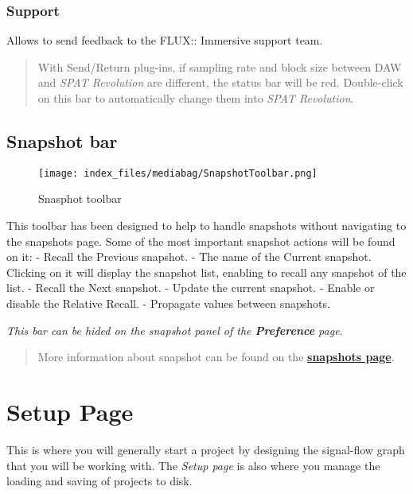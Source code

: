\documentclass[
  letterpaper,
  DIV=11,
  numbers=noendperiod]{scrreport}
\begin{document}
\hypertarget{support}{%
\subsection{Support}\label{support}}

Allows to send feedback to the FLUX:: Immersive support team.

\begin{quote}
With Send/Return plug-ins, if sampling rate and block size between DAW
and \emph{SPAT Revolution} are different, the status bar will be red.
Double-click on this bar to automatically change them into \emph{SPAT
Revolution}.
\end{quote}

\hypertarget{snapshot-bar}{%
\section{Snapshot bar}\label{snapshot-bar}}

\begin{figure}

{\centering \texttt{[image: index\_files/mediabag/SnapshotToolbar.png]}

}

\caption{Snasphot toolbar}

\end{figure}

This toolbar has been designed to help to handle snapshots without
navigating to the snapshots page. Some of the most important snapshot
actions will be found on it: - Recall the Previous snapshot. - The name
of the Current snapshot. Clicking on it will display the snapshot list,
enabling to recall any snapshot of the list. - Recall the Next snapshot.
- Update the current snapshot. - Enable or disable the Relative Recall.
- Propagate values between snapshots.

\emph{This bar can be hided on the snapshot panel of the
\textbf{Preference} page.}

\begin{quote}
More information about snapshot can be found on the
\textbf{\href{Spat_Environment_Snapshot_Page.md}{snapshots page}}.
\end{quote}

\hypertarget{setup-page}{%
\chapter{Setup Page}\label{setup-page}}

This is where you will generally start a project by designing the
signal-flow graph that you will be working with. The \emph{Setup page}
is also where you manage the loading and saving of projects to disk.
\end{document}
